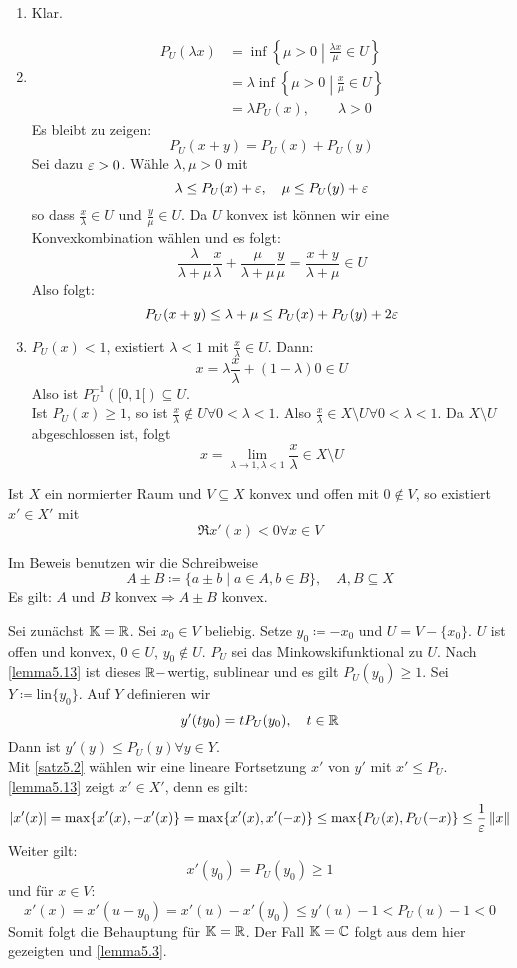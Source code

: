 \begin{beweis}
	\begin{enumerate}
		\item Klar.
		\item 
		\begin{align*} P_U(\lambda x)&=\inf\left\lbrace\mu>0\middle|\frac{\lambda x}{\mu}\in U\right\rbrace\\
		&=\lambda\inf\left\lbrace\mu>0\middle|\frac{x}{\mu}\in U\right\rbrace\\
		&=\lambda P_U(x),\qquad \lambda>0 \end{align*}
		Es bleibt zu zeigen:
		\[ P_U(x+y)=P_U(x)+P_U(y) \]
		Sei dazu $ \varepsilon>0 $. W\"ahle $ \lambda,\mu>0 $ mit
		\[ \lambda\leq P_U(x)+\varepsilon,\quad\mu\leq P_U(y)+\varepsilon \]
		so dass $ \frac{x}{\lambda}\in U $ und $ \frac{y}{\mu}\in U $. Da $ U $ konvex ist k\"onnen wir eine Konvexkombination w\"ahlen und es folgt:
		\[ \frac{\lambda}{\lambda+\mu}\frac{x}{\lambda}+\frac{\mu}{\lambda+\mu}\frac{y}{\mu}=\frac{x+y}{\lambda+\mu}\in U \]
		Also folgt:
		\[ P_U(x+y)\leq\lambda+\mu\leq P_U(x)+P_U(y)+2\varepsilon \]
		\item $ P_U(x)<1 $,  existiert $ \lambda<1 $ mit $ \frac{x}{\lambda}\in U $. Dann:
		\[ x=\lambda\frac{x}{\lambda}+(1-\lambda)0\in U \]
		Also ist $ P_U^{-1}([0,1[)\subseteq U $.\\
		Ist $ P_U(x)\geq 1 $, so ist $ \frac{x}{\lambda}\notin U\forall 0<\lambda<1 $. Also $ \frac{x}{\lambda}\in X\setminus U\forall 0<\lambda<1 $. Da $ X\setminus U $ abgeschlossen ist, folgt
		\[ x=\lim_{\lambda\to 1,\lambda<1}\frac{x}{\lambda}\in X\setminus U \] 
	\end{enumerate}
\end{beweis}
\begin{lemma}
	Ist $ X $ ein normierter Raum und $ V\subseteq X $ konvex und offen mit $ 0\notin V $, so existiert $ x'\in X' $ mit
	\[ \Re x'(x)<0\forall x\in V \]
\end{lemma}
Im Beweis benutzen wir die Schreibweise
\[ A\pm B\coloneqq\lbrace a\pm b\mid a\in A,b\in B\rbrace,\quad A,B\subseteq X \]
Es gilt: $ A $ und $ B $ konvex$ \Rightarrow A\pm B $ konvex.
\begin{beweis}
	Sei zun\"achst $ \mathbb{K}=\mathbb{R} $. Sei $ x_0\in V $ beliebig. Setze $ y_0\coloneqq -x_0 $ und $ U=V-\lbrace x_0\rbrace $. $ U $ ist offen und konvex, $ 0\in U $, $ y_0\notin U $. $ P_U $ sei das Minkowskifunktional zu $ U $. Nach \ref{lemma5.13} ist dieses $ \mathbb{R}- $wertig, sublinear und es gilt $ P_U(y_0)\geq 1 $. Sei $ Y\coloneqq\text{lin}\lbrace y_0\rbrace$. Auf $ Y $ definieren wir
	\[ y'(ty_0)=tP_U(y_0),\quad t\in\mathbb{R} \]
	Dann ist $ y'(y)\leq P_U(y)\forall y\in Y $.\\
	Mit \ref{satz5.2} w\"ahlen wir eine lineare Fortsetzung $ x' $ von $ y' $ mit $ x'\leq P_U $. \ref{lemma5.13} zeigt $ x'\in X' $, denn es gilt:
	\[ |x'(x)|=\max\lbrace x'(x),-x'(x)\rbrace=\max\lbrace x'(x),x'(-x)\rbrace\leq\max\lbrace P_U(x), P_U(-x)\rbrace\leq\frac{1}{\varepsilon}\left\|x\right\| \]
	Weiter gilt:
	\[ x'(y_0)=P_U(y_0)\geq 1 \]
	und f\"ur $ x\in V $:
	\[ x'(x)=x'(u-y_0)=x'(u)-x'(y_0)\leq y'(u)-1<P_U(u)-1<0 \]
	Somit folgt die Behauptung f\"ur $ \mathbb{K}=\mathbb{R} $. Der Fall $ \mathbb{K}=\mathbb{C} $ folgt aus dem hier gezeigten und \ref{lemma5.3}.
\end{beweis}
